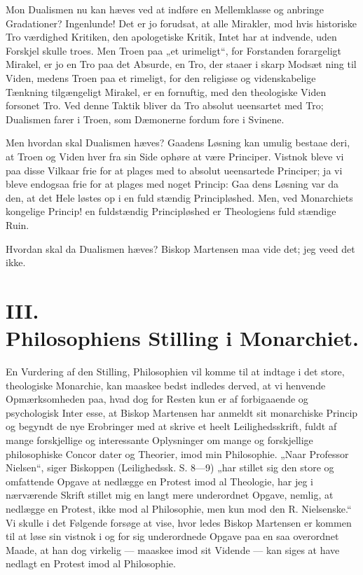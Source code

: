 \documentclass[12pt]{book}
\newcommand{\opage}[1]{\marginnote{\footnotesize\textit{[#1]}}}
\begin{document}
Mon Dualismen nu kan hæves ved at indføre en
Mellemklasse og anbringe Gradationer? Ingenlunde! Det
er jo forudsat, at alle Mirakler, mod hvis historiske Tro\-%
værdighed Kritiken, den apologetiske Kritik, Intet har at
indvende, uden Forskjel skulle troes. Men Troen paa „et
urimeligt“, for Forstanden forargeligt Mirakel, er jo en
Tro paa det Absurde, en Tro, der staaer i skarp Modsæt\-%
ning til Viden, medens Troen paa et rimeligt, for den
religiøse og videnskabelige Tænkning tilgængeligt Mirakel, er
\opage{75}\setcounter{footnote}{0}%
en fornuftig, med den theologiske Viden forsonet Tro. Ved
denne Taktik bliver da Tro absolut ueensartet med Tro;
Dualismen farer i Troen, som Dæmonerne fordum fore i
Svinene.

Men hvordan skal Dualismen hæves? Gaadens Løsning
kan umulig bestaae deri, at Troen og Viden hver fra sin Side
ophøre at være Principer. Vistnok bleve vi paa disse Vilkaar
frie for at plages med to absolut ueensartede Principer; ja vi
bleve endogsaa frie for at plages med noget Princip: Gaa\-%
dens Løsning var da den, at det Hele løstes op i en fuld\-%
stændig Principløshed. Men, ved Monarchiets kongelige
Princip! en fuldstændig Principløshed er Theologiens fuld\-%
stændige Ruin.

Hvordan skal da Dualismen hæves? Biskop Martensen
maa vide det; jeg veed det ikke.

\section*{III.\\ Philosophiens Stilling i Monarchiet.}

En Vurdering af den Stilling, Philosophien vil komme til
at indtage i det store, theologiske Monarchie, kan maaskee bedst
indledes derved, at vi henvende Opmærksomheden paa, hvad
dog for Resten kun er af forbigaaende og psychologisk Inter\-%
esse, at Biskop Martensen har anmeldt sit monarchiske
Princip og begyndt de nye Erobringer med at skrive et heelt
Leilighedsskrift, fuldt af mange forskjellige og interessante
Oplysninger om mange og forskjellige philosophiske Concor\-%
dater og Theorier, imod min Philosophie. „Naar Professor
Nielsen“, siger Biskoppen (Leilighedssk. S. 8---9) „har stillet
sig den store og omfattende Opgave at nedlægge en Protest
imod al Theologie, har jeg i nærværende Skrift stillet mig
en langt mere underordnet Opgave, nemlig, at nedlægge en
Protest, ikke mod al Philosophie, men kun mod den R.
\opage{76}\setcounter{footnote}{0}%
Nielsenske.“ Vi skulle i det Følgende forsøge at vise, hvor\-%
ledes Biskop Martensen er kommen til at løse sin vistnok i
og for sig underordnede Opgave paa en saa overordnet
Maade, at han dog virkelig --- maaskee imod sit Vidende ---
kan siges at have nedlagt en Protest imod al Philosophie.
\end{document}
